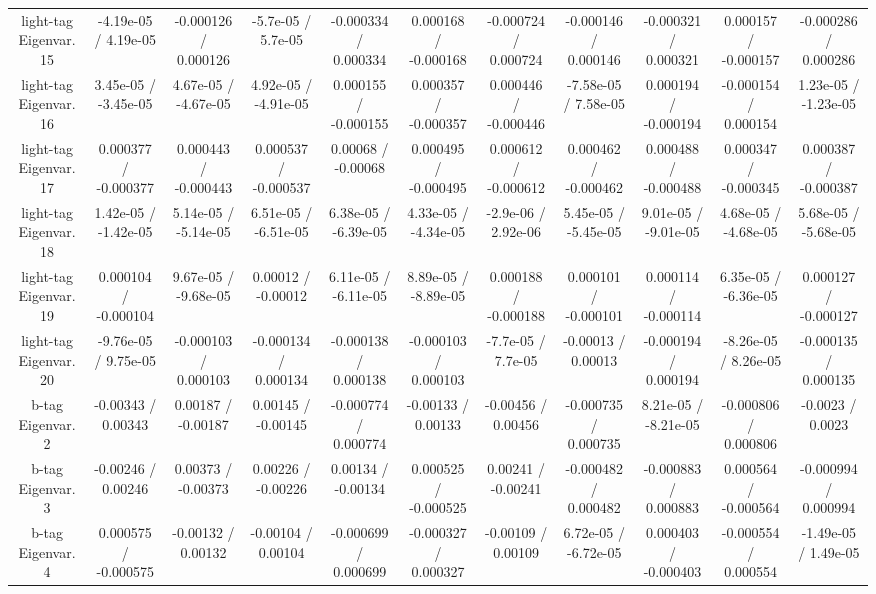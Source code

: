 {\begin{landscape}
\begin{longtable}{@{\extracolsep{\fill}}| *{11}{c|}}
  light-tag Eigenvar. 15 & -4.19e-05 / 4.19e-05 & -0.000126 / 0.000126 & -5.7e-05 / 5.7e-05 & -0.000334 / 0.000334 & 0.000168 / -0.000168 & -0.000724 / 0.000724 & -0.000146 / 0.000146 & -0.000321 / 0.000321 & 0.000157 / -0.000157 & -0.000286 / 0.000286 \\ 
  light-tag Eigenvar. 16 & 3.45e-05 / -3.45e-05 & 4.67e-05 / -4.67e-05 & 4.92e-05 / -4.91e-05 & 0.000155 / -0.000155 & 0.000357 / -0.000357 & 0.000446 / -0.000446 & -7.58e-05 / 7.58e-05 & 0.000194 / -0.000194 & -0.000154 / 0.000154 & 1.23e-05 / -1.23e-05 \\ 
  light-tag Eigenvar. 17 & 0.000377 / -0.000377 & 0.000443 / -0.000443 & 0.000537 / -0.000537 & 0.00068 / -0.00068 & 0.000495 / -0.000495 & 0.000612 / -0.000612 & 0.000462 / -0.000462 & 0.000488 / -0.000488 & 0.000347 / -0.000345 & 0.000387 / -0.000387 \\ 
  light-tag Eigenvar. 18 & 1.42e-05 / -1.42e-05 & 5.14e-05 / -5.14e-05 & 6.51e-05 / -6.51e-05 & 6.38e-05 / -6.39e-05 & 4.33e-05 / -4.34e-05 & -2.9e-06 / 2.92e-06 & 5.45e-05 / -5.45e-05 & 9.01e-05 / -9.01e-05 & 4.68e-05 / -4.68e-05 & 5.68e-05 / -5.68e-05 \\ 
  light-tag Eigenvar. 19 & 0.000104 / -0.000104 & 9.67e-05 / -9.68e-05 & 0.00012 / -0.00012 & 6.11e-05 / -6.11e-05 & 8.89e-05 / -8.89e-05 & 0.000188 / -0.000188 & 0.000101 / -0.000101 & 0.000114 / -0.000114 & 6.35e-05 / -6.36e-05 & 0.000127 / -0.000127 \\ 
  light-tag Eigenvar. 20 & -9.76e-05 / 9.75e-05 & -0.000103 / 0.000103 & -0.000134 / 0.000134 & -0.000138 / 0.000138 & -0.000103 / 0.000103 & -7.7e-05 / 7.7e-05 & -0.00013 / 0.00013 & -0.000194 / 0.000194 & -8.26e-05 / 8.26e-05 & -0.000135 / 0.000135 \\ 
  b-tag Eigenvar. 2 & -0.00343 / 0.00343 & 0.00187 / -0.00187 & 0.00145 / -0.00145 & -0.000774 / 0.000774 & -0.00133 / 0.00133 & -0.00456 / 0.00456 & -0.000735 / 0.000735 & 8.21e-05 / -8.21e-05 & -0.000806 / 0.000806 & -0.0023 / 0.0023 \\ 
  b-tag Eigenvar. 3 & -0.00246 / 0.00246 & 0.00373 / -0.00373 & 0.00226 / -0.00226 & 0.00134 / -0.00134 & 0.000525 / -0.000525 & 0.00241 / -0.00241 & -0.000482 / 0.000482 & -0.000883 / 0.000883 & 0.000564 / -0.000564 & -0.000994 / 0.000994 \\ 
  b-tag Eigenvar. 4 & 0.000575 / -0.000575 & -0.00132 / 0.00132 & -0.00104 / 0.00104 & -0.000699 / 0.000699 & -0.000327 / 0.000327 & -0.00109 / 0.00109 & 6.72e-05 / -6.72e-05 & 0.000403 / -0.000403 & -0.000554 / 0.000554 & -1.49e-05 / 1.49e-05 \\ 

\end{longtable}
\end{landscape}}
